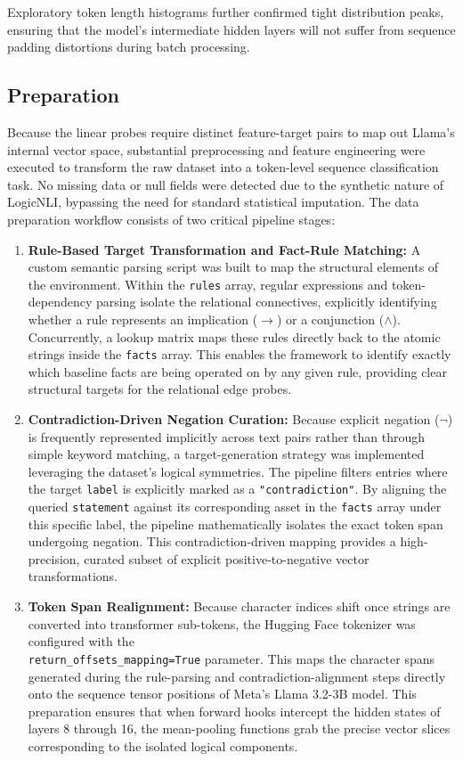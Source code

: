 \documentclass[12 pt]{article}  %
\begin{document}
Exploratory token length histograms further confirmed tight distribution peaks, 
ensuring that the model's intermediate hidden layers will not suffer from 
sequence padding distortions during batch processing.

\subsection{Preparation}
Because the linear probes require distinct feature-target pairs to map out 
Llama's internal vector space, substantial preprocessing and feature 
engineering were executed to transform the raw dataset into a token-level 
sequence classification task.
No missing data or null fields were detected due 
to the synthetic nature of LogicNLI, bypassing the need for standard 
statistical imputation.
The data preparation workflow consists of two critical pipeline stages:
\begin{enumerate}
    \item \textbf{Rule-Based Target Transformation and Fact-Rule Matching:} A 
    custom semantic parsing script was built to map the structural elements of 
    the environment. Within the \texttt{rules} array, regular expressions and 
    token-dependency parsing isolate the relational connectives, explicitly 
    identifying whether a rule represents an implication ($\rightarrow$) or a 
    conjunction ($\land$). Concurrently, a lookup matrix maps these rules 
    directly back to the atomic strings inside the \texttt{facts} array. This 
    enables the framework to identify exactly which baseline facts are being 
    operated on by any given rule, providing clear structural targets for the 
    relational edge probes.
    \item \textbf{Contradiction-Driven Negation Curation:} Because explicit 
    negation ($\neg$) is frequently represented implicitly across text pairs 
    rather than through simple keyword matching, a target-generation strategy 
    was implemented leveraging the dataset's logical symmetries. The pipeline 
    filters entries where the target \texttt{label} is explicitly marked as a 
    \texttt{"contradiction"}. By aligning the queried \texttt{statement} 
    against its corresponding asset in the \texttt{facts} array under this 
    specific label, the pipeline mathematically isolates the exact token span 
    undergoing negation. This contradiction-driven mapping provides a 
    high-precision, curated subset of explicit positive-to-negative vector 
    transformations.
    \item \textbf{Token Span Realignment:} Because character indices shift once 
    strings are converted into transformer sub-tokens, the Hugging Face 
    tokenizer was configured with the \\\texttt{return\_offsets\_mapping=True} 
    parameter. This maps the character spans generated during the rule-parsing 
    and contradiction-alignment steps directly onto the sequence tensor 
    positions of Meta's Llama 3.2-3B model. This preparation ensures that when 
    forward hooks intercept the hidden states of layers 8 through 16, the 
    mean-pooling functions grab the precise vector slices corresponding to the 
    isolated logical components.
\end{enumerate}
\end{document}
